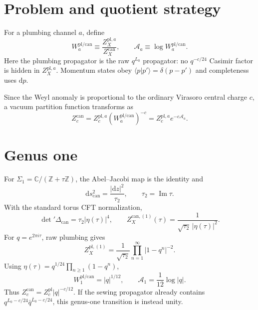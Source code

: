 \documentclass[11pt]{article}
\newcommand{\dd}{\mathrm d}
\newcommand{\cA}{\mathcal A}
\newcommand{\pl}{\mathrm{pl}}
\newcommand{\can}{\mathrm{can}}
\begin{document}
\section{Problem and quotient strategy}

For a plumbing channel $a$, define
\begin{equation}
 W_a^{\pl/\can}
 \equiv\frac{Z_X^{\pl,a}}{Z_X^{\can}},
 \qquad
 \cA_a\equiv\log W_a^{\pl/\can}.
 \label{eq:weyl-definition}
\end{equation}
Here the plumbing propagator is the raw $q^{L_0}$ propagator: no
$q^{-c/24}$ Casimir factor is hidden in $Z_X^{\pl,a}$.  Momentum states obey
$\langle p|p'\rangle=\delta(p-p')$ and completeness uses $\dd p$.

Since the Weyl anomaly is proportional to the ordinary Virasoro central
charge $c$, a vacuum partition function transforms as
\begin{equation}
 \boxed{
 Z_c^{\can}=Z_c^{\pl,a}\left(W_a^{\pl/\can}\right)^{-c}
 =Z_c^{\pl,a}e^{-c\cA_a}.}
 \label{eq:central-charge-power}
\end{equation}

\section{Genus one}

For $\Sigma_1=\mathbb C/(\mathbb Z+\tau\mathbb Z)$, the Abel--Jacobi map is
the identity and
\begin{equation}
 \dd s_{\can}^2=\frac{|\dd z|^2}{\tau_2},
 \qquad \tau_2=\operatorname{Im}\tau.
\end{equation}
With the standard torus CFT normalization,
\begin{equation}
 \det{}'\Delta_{\can}=\tau_2|\eta(\tau)|^4,
 \qquad
 \boxed{Z_X^{\can,(1)}(\tau)
 =\frac{1}{\sqrt{\tau_2}\,|\eta(\tau)|^2}.}
 \label{eq:genus1-canonical}
\end{equation}
For $q=e^{2\pi i\tau}$, raw plumbing gives
\begin{equation}
 Z_X^{\pl,(1)}
 =\frac{1}{\sqrt{\tau_2}}
   \prod_{n=1}^{\infty}|1-q^n|^{-2}.
\end{equation}
Using $\eta(\tau)=q^{1/24}\prod_{n\geq1}(1-q^n)$,
\begin{equation}
 \boxed{
 W_1^{\pl/\can}=|q|^{1/12},
 \qquad
 \cA_1=\frac{1}{12}\log|q|.}
 \label{eq:genus1-weyl}
\end{equation}
Thus $Z_c^{\can}=Z_c^{\pl}|q|^{-c/12}$.  If the sewing propagator already
contains $q^{L_0-c/24}\bar q^{\bar L_0-c/24}$, this genus-one transition is
instead unity.
\end{document}
